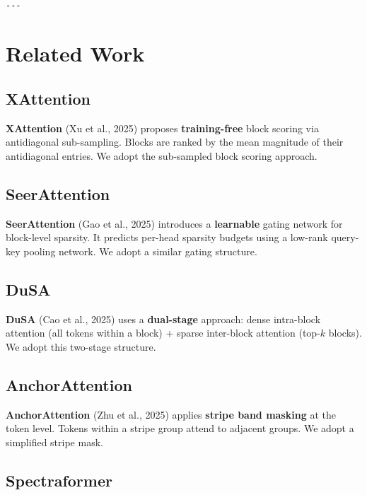 \begin{lstlisting}

---
\end{lstlisting}

\section{Related Work}

\subsection{XAttention}

\textbf{XAttention} (Xu et al., 2025) proposes \textbf{training-free} block scoring via 
antidiagonal sub-sampling. Blocks are ranked by the mean magnitude of their 
antidiagonal entries. We adopt the sub-sampled block scoring approach.

\subsection{SeerAttention}

\textbf{SeerAttention} (Gao et al., 2025) introduces a \textbf{learnable} gating network 
for block-level sparsity. It predicts per-head sparsity budgets using a 
low-rank query-key pooling network. We adopt a similar gating structure.

\subsection{DuSA}

\textbf{DuSA} (Cao et al., 2025) uses a \textbf{dual-stage} approach: dense intra-block 
attention (all tokens within a block) + sparse inter-block attention (top-$k$ 
blocks). We adopt this two-stage structure.

\subsection{AnchorAttention}

\textbf{AnchorAttention} (Zhu et al., 2025) applies \textbf{stripe band masking} at the 
token level. Tokens within a stripe group attend to adjacent groups. We adopt 
a simplified stripe mask.

\subsection{Spectraformer}

